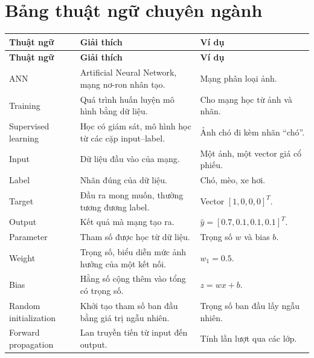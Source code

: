 \documentclass[12pt,a4paper]{report}
\begin{document}
\chapter{Bảng thuật ngữ chuyên ngành}

\small
\begin{longtable}{p{}p{}p{}}
\toprule
\textbf{Thuật ngữ} & \textbf{Giải thích} & \textbf{Ví dụ} \\
\midrule
\endfirsthead

\toprule
\textbf{Thuật ngữ} & \textbf{Giải thích} & \textbf{Ví dụ} \\
\midrule
\endhead

ANN & Artificial Neural Network, mạng nơ-ron nhân tạo. & Mạng phân loại ảnh. \\

Training & Quá trình huấn luyện mô hình bằng dữ liệu. & Cho mạng học từ ảnh và nhãn. \\

Supervised learning & Học có giám sát, mô hình học từ các cặp input--label. & Ảnh chó đi kèm nhãn ``chó''. \\

Input & Dữ liệu đầu vào của mạng. & Một ảnh, một vector giá cổ phiếu. \\

Label & Nhãn đúng của dữ liệu. & Chó, mèo, xe hơi. \\

Target & Đầu ra mong muốn, thường tương đương label. & Vector $[1,0,0,0]^T$. \\

Output & Kết quả mà mạng tạo ra. & $\hat{y}=[0.7,0.1,0.1,0.1]^T$. \\

Parameter & Tham số được học từ dữ liệu. & Trọng số $w$ và bias $b$. \\

Weight & Trọng số, biểu diễn mức ảnh hưởng của một kết nối. & $w_1=0.5$. \\

Bias & Hằng số cộng thêm vào tổng có trọng số. & $z=wx+b$. \\

Random initialization & Khởi tạo tham số ban đầu bằng giá trị ngẫu nhiên. & Trọng số ban đầu lấy ngẫu nhiên. \\

Forward propagation & Lan truyền tiến từ input đến output. & Tính lần lượt qua các lớp. \\


\end{longtable}
\end{document}

